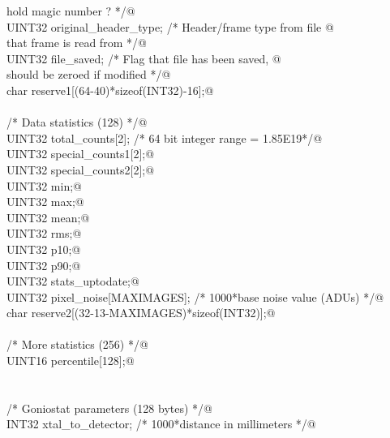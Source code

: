 \documentclass[10pt,a4paper,twoside,notitlepage]{article}
\begin{document}
\begin{flushleft}
\begin{list}{}{}
\mbox{}\verb@                                              hold magic number ? */@\\
\mbox{}\verb@         UINT32        original_header_type;     /* Header/frame type from  file @\\
\mbox{}\verb@                                                    that frame is read from */@\\
\mbox{}\verb@         UINT32        file_saved;         /* Flag that file has been  saved, @\\
\mbox{}\verb@                                              should be zeroed if modified */@\\
\mbox{}\verb@         char reserve1[(64-40)*sizeof(INT32)-16];@\\
\mbox{}\verb@@\\
\mbox{}\verb@         /* Data statistics (128) */@\\
\mbox{}\verb@         UINT32        total_counts[2];  /* 64 bit integer range = 1.85E19*/@\\
\mbox{}\verb@         UINT32        special_counts1[2];@\\
\mbox{}\verb@         UINT32        special_counts2[2];@\\
\mbox{}\verb@         UINT32        min;@\\
\mbox{}\verb@         UINT32        max;@\\
\mbox{}\verb@         UINT32        mean;@\\
\mbox{}\verb@         UINT32        rms;@\\
\mbox{}\verb@         UINT32        p10;@\\
\mbox{}\verb@         UINT32        p90;@\\
\mbox{}\verb@         UINT32        stats_uptodate;@\\
\mbox{}\verb@         UINT32        pixel_noise[MAXIMAGES]; /* 1000*base noise value (ADUs) */@\\
\mbox{}\verb@         char reserve2[(32-13-MAXIMAGES)*sizeof(INT32)];@\\
\mbox{}\verb@@\\
\mbox{}\verb@         /* More statistics (256) */@\\
\mbox{}\verb@         UINT16 percentile[128];@\\
\mbox{}\verb@@\\
\mbox{}\verb@@\\
\mbox{}\verb@         /* Goniostat parameters (128 bytes) */@\\
\mbox{}\verb@         INT32 xtal_to_detector;  /* 1000*distance in millimeters */@\\

\end{list}
\end{flushleft}
\end{document}
